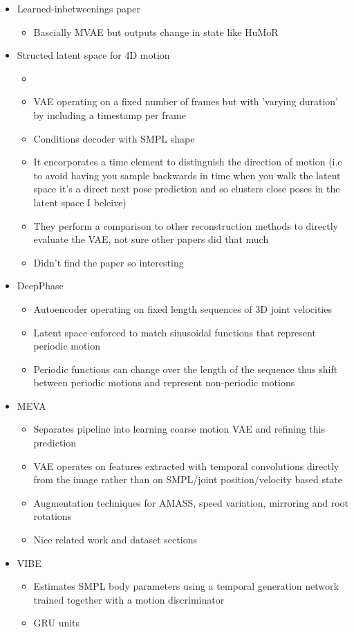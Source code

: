 \begin{itemize}
\begin{itemize}
    \end{itemize}
    \item Learned-inbetweenings paper \cite{learnedInbetweening}
    \begin{itemize}
        \item Bascially MVAE but outputs change in state like HuMoR
    \end{itemize}
    \item Structed latent space for 4D motion
    \begin{itemize}
        \item \cite{structured4Dlatentspace}
        \item VAE operating on a fixed number of frames but with 'varying duration' by including a timestamp per frame
        \item Conditions decoder with SMPL shape
        \item It encorporates a time element to distinguish the direction of motion (i.e to avoid having you sample backwards in time when you walk the latent space it's a direct next pose prediction and so clusters close poses in the latent space I beleive)
        \item They perform a comparison to other reconstruction methods to directly evaluate the VAE, not sure other papers did that much
        \item Didn't find the paper so interesting
    \end{itemize}
    \item DeepPhase
    \begin{itemize}
        \item Autoencoder operating on fixed length sequences of 3D joint velocities
        \item Latent space enforced to match sinusoidal functions that represent periodic motion
        \item Periodic functions can change over the length of the sequence thus shift between periodic motions and represent non-periodic motions
    \end{itemize}
    \item MEVA
    \begin{itemize}
        \item Separates pipeline into learning coarse motion VAE and refining this prediction
        \item VAE operates on features extracted with temporal convolutions directly from the image rather than on SMPL/joint position/velocity based state
        \item Augmentation techniques for AMASS, speed variation, mirroring and root rotations
        \item Nice related work and dataset sections
    \end{itemize}
    \item VIBE
    \begin{itemize}
        \item Estimates SMPL body parameters using a temporal generation network trained together with a motion discriminator
        \item GRU units
    \end{itemize}


\end{itemize}
